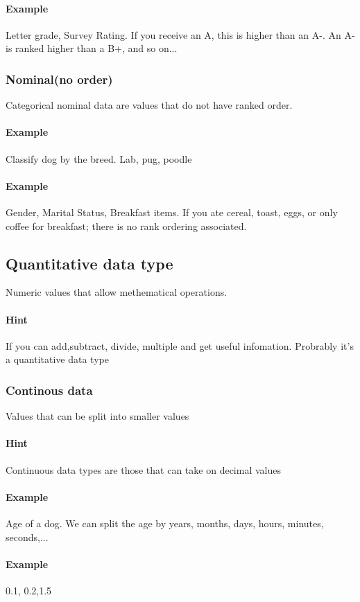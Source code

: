 \documentclass[]{article}
\begin{document}
\paragraph{Example} Letter grade, Survey Rating. If you receive an A, this is higher than an A-. An A- is ranked higher than a B+, and so on...

\subsubsection{Nominal(no order)}
Categorical nominal data are values that do not have ranked order.
\paragraph{Example} Classify dog by the breed. Lab, pug, poodle
\paragraph{Example} Gender, Marital Status, Breakfast items. If you ate cereal, toast, eggs, or only coffee for breakfast; there is no rank ordering associated.

\subsection{Quantitative data type}
Numeric values that allow methematical operations.
\paragraph{Hint} If you can add,subtract, divide, multiple and get useful infomation. Probrably it's a quantitative data type
\subsubsection{Continous data}
Values that can be split into smaller values
\paragraph{Hint} Continuous data types are those that can take on decimal values
\paragraph{Example} Age of a dog. We can split the age by years, months, days, hours, minutes, seconds,...
\paragraph{Example} 0.1, 0.2,1.5
\end{document}
